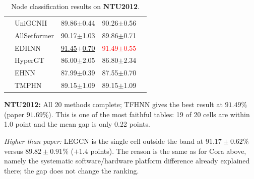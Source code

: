 \documentclass[11pt,a4paper]{article}
\begin{document}
\begin{table}[H]
\begin{tabular}{llccc}
		 & UniGCNII          & 89.86$\pm$0.44   & 90.26$\pm$0.56   &  \\
		 & AllSetformer      & 90.17$\pm$1.03   & 89.86$\pm$0.71   &  \\
		 & EDHNN             & \underline{91.45$\pm$0.70}   & \textcolor{red}{91.49$\pm$0.55}   &  \\
		 & HyperGT           & 86.00$\pm$2.05   & 86.80$\pm$2.34   &  \\
		 & EHNN              & 87.99$\pm$0.39   & 87.55$\pm$0.70   &  \\
		 & TMPHN             & 89.15$\pm$1.09   & 89.15$\pm$1.09   &  \\
		\bottomrule
	\end{tabular}
	\caption{Node classification results on \textbf{NTU2012}.}
\end{table}

\par\smallskip
\noindent\textbf{NTU2012:} All 20 methods complete; TFHNN gives the best result at $91.49\%$ (paper $91.69\%$). This is one of the most faithful tables: 19 of 20 cells are within 1.0 point and the mean gap is only 0.22 points.

\noindent\textit{Higher than paper:} LEGCN is the single cell outside the band at $91.17\pm0.62\%$ versus $89.82\pm0.91\%$ ($+1.4$ points). The reason is the same as for Cora above, namely the systematic software/hardware platform difference already explained there; the gap does not change the ranking.
\end{document}
